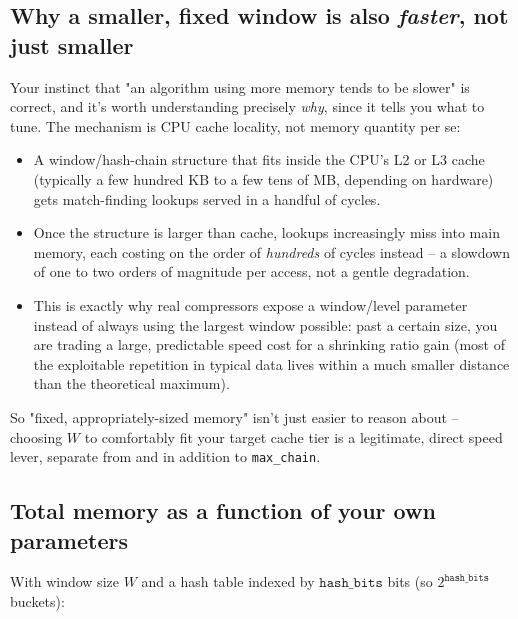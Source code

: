 \documentclass[11pt]{article}
\begin{document}
\subsection{Why a smaller, fixed window is also \emph{faster}, not just smaller}
\label{sec:cache}

Your instinct that "an algorithm using more memory tends to be slower" is correct, and
it's worth understanding precisely \emph{why}, since it tells you what to tune. The
mechanism is CPU cache locality, not memory quantity per se:

\begin{itemize}
  \item A window/hash-chain structure that fits inside the CPU's L2 or L3 cache (typically
  a few hundred KB to a few tens of MB, depending on hardware) gets match-finding
  lookups served in a handful of cycles.
  \item Once the structure is larger than cache, lookups increasingly miss into main
  memory, each costing on the order of \emph{hundreds} of cycles instead -- a slowdown
  of one to two orders of magnitude per access, not a gentle degradation.
  \item This is exactly why real compressors expose a window/level parameter instead of
  always using the largest window possible: past a certain size, you are trading a
  large, predictable speed cost for a shrinking ratio gain (most of the exploitable
  repetition in typical data lives within a much smaller distance than the theoretical
  maximum).
\end{itemize}

So "fixed, appropriately-sized memory" isn't just easier to reason about -- choosing $W$
to comfortably fit your target cache tier is a legitimate, direct speed lever, separate
from and in addition to \texttt{max\_chain}.

\subsection{Total memory as a function of your own parameters}
\label{sec:memformula}

With window size $W$ and a hash table indexed by $\texttt{hash\_bits}$ bits (so
$2^{\texttt{hash\_bits}}$ buckets):
\end{document}
